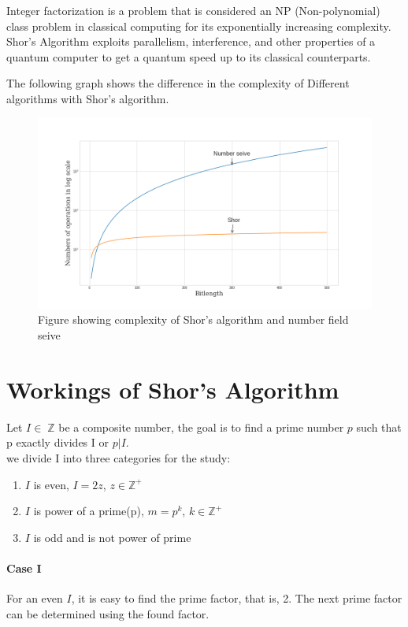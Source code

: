 Integer factorization is a problem that is considered an NP (Non-polynomial) class problem in classical computing for its exponentially increasing complexity. Shor's Algorithm exploits parallelism, interference, and other properties of a quantum computer to get a quantum speed up to its classical counterparts.

The following graph shows the difference in the complexity of Different algorithms with Shor's algorithm.
\begin{figure}[H]
  \centering
  \includegraphics[width = \linewidth]{figures/numberseive_vs_shor.png}
      \caption{Figure showing complexity of Shor's algorithm and number field seive }
  \label{fig: complexity_comparision}
\end{figure}

 
\section{Workings of Shor's Algorithm}
Let $I \in \; \mathbb{Z}$ be a composite number, the goal is to find a prime number $p$ such that p exactly divides I or $p|I$. \\
 we divide  I into three categories for the study:
 \renewcommand{\labelenumi}{\Roman{enumi}}
 \begin{enumerate}
     \item $I$ is even, $I= 2z$, $z \in \mathbb{Z}^+$
     \item $I$ is power of a prime(p), $m = p^k$, $k \in \mathbb{Z}^+$
     \item $I$ is odd and is not power of prime
 \end{enumerate}
\paragraph{Case I \\} 
For an even $I$, it is easy to find the prime factor, that is, 2. The next prime factor can be determined using the found factor.
